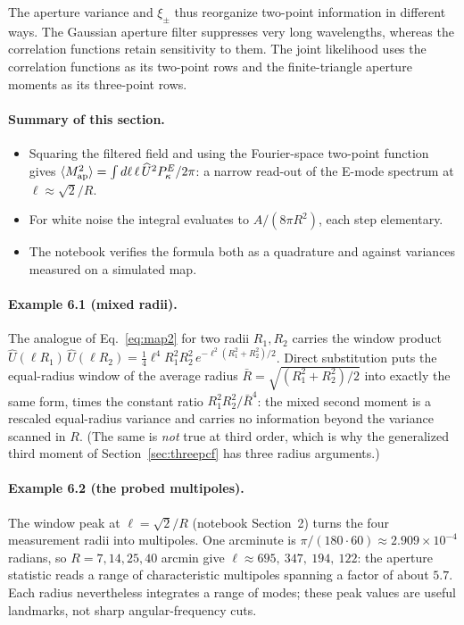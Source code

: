 \documentclass[11pt]{article}
\newcommand{\Map}{M_{\rm ap}}
\newcommand{\Uhat}{\widehat{U}}
\numberwithin{equation}{section}
\begin{document}
The aperture variance and $\xi_\pm$ thus reorganize two-point information
in different ways. The Gaussian aperture filter suppresses very long
wavelengths, whereas the correlation functions retain sensitivity to them.
The joint likelihood uses the correlation functions as its two-point
rows and the finite-triangle aperture moments as its three-point rows.

\paragraph{Summary of this section.}
\begin{itemize}
  \item Squaring the filtered field and using the Fourier-space
    two-point function gives
    $\langle\Map^2\rangle = \int d\ell\,\ell\,\Uhat^2
    P^E_\kappa/2\pi$: a narrow read-out of the E-mode spectrum at
    $\ell \approx \sqrt{2}/R$.
  \item For white noise the integral evaluates to $A/(8\pi R^2)$,
    each step elementary.
  \item The notebook verifies the formula both as a quadrature and
    against variances measured on a simulated map.
\end{itemize}

\paragraph{Example 6.1 (mixed radii).}
The analogue of Eq.~\eqref{eq:map2} for two radii $R_1, R_2$
carries the window product
$\Uhat(\ell R_1)\,\Uhat(\ell R_2) =
\tfrac14 \ell^4 R_1^2 R_2^2\, e^{-\ell^2(R_1^2+R_2^2)/2}$.  Direct
substitution puts the equal-radius window of the average radius
$\bar R = \sqrt{(R_1^2+R_2^2)/2}$ into exactly the same form, times
the constant ratio $R_1^2 R_2^2/\bar R^4$: the mixed second moment
is a rescaled equal-radius variance and carries no information
beyond the variance scanned in $R$.  (The same is \emph{not} true
at third order, which is why the generalized third moment of
Section~\ref{sec:threepcf} has three radius arguments.)

\paragraph{Example 6.2 (the probed multipoles).}
The window peak at $\ell = \sqrt{2}/R$ (notebook Section~2) turns
the four measurement radii into multipoles.  One arcminute is
$\pi/(180\cdot 60) \approx 2.909\times 10^{-4}$ radians, so
$R = 7, 14, 25, 40$ arcmin give
$\ell \approx 695,\ 347,\ 194,\ 122$: the aperture statistic reads
a range of characteristic multipoles spanning a factor of about $5.7$.
Each radius nevertheless integrates a range of modes; these peak values
are useful landmarks, not sharp angular-frequency cuts.
\end{document}
